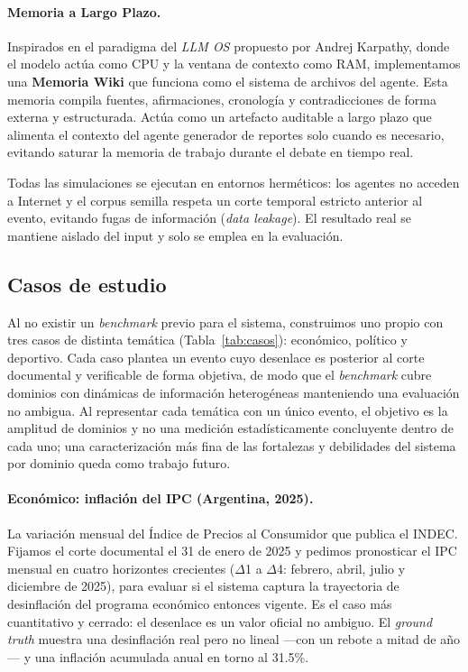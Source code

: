 \documentclass[11pt]{article}
\begin{document}
\paragraph{Memoria a Largo Plazo.} Inspirados en el paradigma del \textit{LLM OS} propuesto por Andrej Karpathy, donde el modelo actúa como CPU y la ventana de contexto como RAM, implementamos una \textbf{Memoria Wiki} que funciona como el sistema de archivos del agente. Esta memoria compila fuentes, afirmaciones, cronología y contradicciones de forma externa y estructurada. Actúa como un artefacto auditable a largo plazo que alimenta el contexto del agente generador de reportes solo cuando es necesario, evitando saturar la memoria de trabajo durante el debate en tiempo real.

Todas las simulaciones se ejecutan en entornos herméticos: los agentes no acceden a Internet y el corpus semilla respeta un corte temporal estricto anterior al evento, evitando fugas de información (\textit{data leakage}). El resultado real se mantiene aislado del input y solo se emplea en la evaluación.

\subsection{Casos de estudio}
\label{subsec:casos}

Al no existir un \textit{benchmark} previo para el sistema, construimos uno propio con tres casos de distinta temática (Tabla~\ref{tab:casos}): económico, político y deportivo. Cada caso plantea un evento cuyo desenlace es posterior al corte documental y verificable de forma objetiva, de modo que el \textit{benchmark} cubre dominios con dinámicas de información heterogéneas manteniendo una evaluación no ambigua. Al representar cada temática con un único evento, el objetivo es la amplitud de dominios y no una medición estadísticamente concluyente dentro de cada uno; una caracterización más fina de las fortalezas y debilidades del sistema por dominio queda como trabajo futuro.

\paragraph{Económico: inflación del IPC (Argentina, 2025).} La variación mensual del Índice de Precios al Consumidor que publica el INDEC. Fijamos el corte documental el 31 de enero de 2025 y pedimos pronosticar el IPC mensual en cuatro horizontes crecientes ($\Delta$1 a $\Delta$4: febrero, abril, julio y diciembre de 2025), para evaluar si el sistema captura la trayectoria de desinflación del programa económico entonces vigente. Es el caso más cuantitativo y cerrado: el desenlace es un valor oficial no ambiguo. El \textit{ground truth} muestra una desinflación real pero no lineal —con un rebote a mitad de año— y una inflación acumulada anual en torno al 31.5\%.
\end{document}
